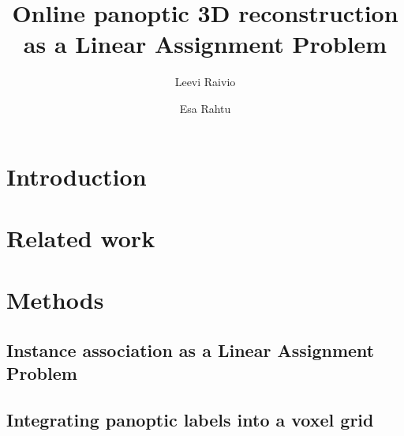 \documentclass[runningheads]{llncs}
\begin{document}
%
\title{Online panoptic 3D reconstruction as a Linear Assignment Problem}
%
%
\author{Leevi Raivio \and
Esa Rahtu}
%
%
%
\maketitle              %
%
\begin{abstract}


\end{abstract}
%
%
%
\section{Introduction}
    \label{sec:intro}
    

\section{Related work}
    \label{sec:background}
    

\section{Methods}
    \label{sec:methods}
    
        
    \subsection{Instance association as a Linear Assignment Problem}
        \label{subsec:association}
        
      
    \subsection{Integrating panoptic labels into a voxel grid}
        \label{subsec:integration}
        
        
\end{document}
